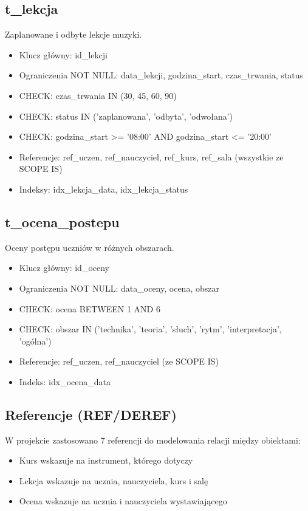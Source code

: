 \documentclass[12pt,a4paper]{article}
\begin{document}
\subsection{t\_lekcja}

Zaplanowane i odbyte lekcje muzyki.

\begin{itemize}[nosep]
    \item Klucz główny: id\_lekcji
    \item Ograniczenia NOT NULL: data\_lekcji, godzina\_start, czas\_trwania, status
    \item CHECK: czas\_trwania IN (30, 45, 60, 90)
    \item CHECK: status IN ('zaplanowana', 'odbyta', 'odwołana')
    \item CHECK: godzina\_start >= '08:00' AND godzina\_start <= '20:00'
    \item Referencje: ref\_uczen, ref\_nauczyciel, ref\_kurs, ref\_sala (wszystkie ze SCOPE IS)
    \item Indeksy: idx\_lekcja\_data, idx\_lekcja\_status
\end{itemize}

\subsection{t\_ocena\_postepu}

Oceny postępu uczniów w różnych obszarach.

\begin{itemize}[nosep]
    \item Klucz główny: id\_oceny
    \item Ograniczenia NOT NULL: data\_oceny, ocena, obszar
    \item CHECK: ocena BETWEEN 1 AND 6
    \item CHECK: obszar IN ('technika', 'teoria', 'słuch', 'rytm', 'interpretacja', 'ogólna')
    \item Referencje: ref\_uczen, ref\_nauczyciel (ze SCOPE IS)
    \item Indeks: idx\_ocena\_data
\end{itemize}

\subsection{Referencje (REF/DEREF)}

W projekcie zastosowano 7 referencji do modelowania relacji między obiektami:

\begin{itemize}[nosep]
    \item Kurs wskazuje na instrument, którego dotyczy
    \item Lekcja wskazuje na ucznia, nauczyciela, kurs i salę
    \item Ocena wskazuje na ucznia i nauczyciela wystawiającego
\end{itemize}
\end{document}
